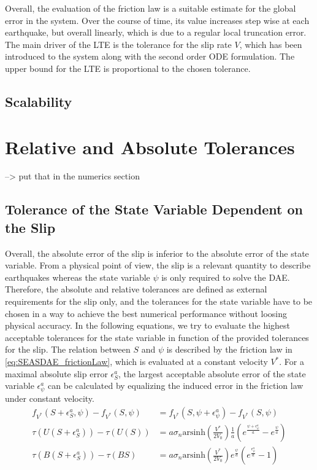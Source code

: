 Overall, the evaluation of the friction law is a suitable estimate for the global error in the system. Over the course of time, its value increases step wise at each earthquake, but overall linearly, which is due to a regular local truncation error. The main driver of the LTE is the tolerance for the slip rate $V$, which has been introduced to the system along with the second order ODE formulation. The upper bound for the LTE is proportional to the chosen tolerance.

\subsection{Scalability}

\section{Relative and Absolute Tolerances}
--> put that in the numerics section


\subsection{Tolerance of the State Variable Dependent on the Slip}
Overall, the absolute error of the slip is inferior to the absolute error of the state variable. From a physical point of view, the slip is a relevant quantity to describe earthquakes whereas the state variable $\psi$ is only required to solve the DAE. Therefore, the absolute and relative tolerances are defined as external requirements for the slip only, and the tolerances for the state variable have to be chosen in a way to achieve the best numerical performance without loosing physical accuracy. In the following equations, we try to evaluate the highest acceptable tolerances for the state variable in function of the provided tolerances for the slip. The relation between $S$ and $\psi$ is described by the friction law in \autoref{eq:SEASDAE_frictionLaw}, which is evaluated at a constant velocity $V^*$. For a maximal absolute slip error $\epsilon_S^a$, the largest acceptable absolute error of the state variable $\epsilon_\psi^a$ can be calculated by equalizing the induced error in the friction law under constant velocity. 
\begin{align}
    f_{V^*}(S+\epsilon_S^a,\psi) - f_{V^*}(S,\psi) &= f_{V^*}(S,\psi+\epsilon_\psi^a) - f_{V^*}(S,\psi) \\
    \tau(U(S+\epsilon_S^a)) - \tau(U(S)) &= a \sigma_n \text{arsinh}\left(\frac{V^*}{2V_0}\right)\frac{1}{a}\left(e^{\frac{\psi+\epsilon_\psi^a}{a}} - e^{\frac{\psi}{a}}\right) \\
    \tau(B(S+\epsilon_S^a)) - \tau(BS) &= a \sigma_n \text{arsinh}\left(\frac{V^*}{2V_0}\right) e^{\frac{\psi}{a}}\left(e^{\frac{\epsilon_\psi^a}{a}} - 1\right)
\end{align}

